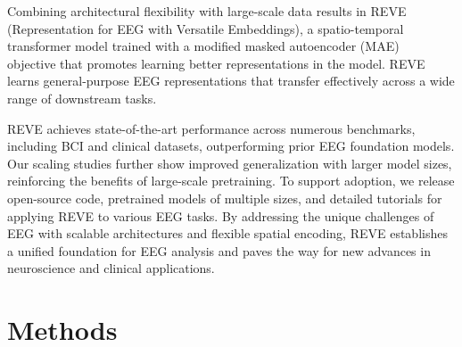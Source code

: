 \documentclass{article}
\begin{document}
Combining architectural flexibility with large-scale data results in REVE (Representation for EEG with Versatile Embeddings), a spatio-temporal transformer model trained with a modified masked autoencoder (MAE)~\citep{he2022masked} objective that promotes learning better representations in the model. REVE learns general-purpose EEG representations that transfer effectively across a wide range of downstream tasks.



REVE achieves state-of-the-art performance across numerous benchmarks, including BCI and clinical datasets, outperforming prior EEG foundation models. Our scaling studies further show improved generalization with larger model sizes, reinforcing the benefits of large-scale pretraining. To support adoption, we release open-source code, pretrained models of multiple sizes, and detailed tutorials for applying REVE to various EEG tasks. By addressing the unique challenges of EEG with scalable architectures and flexible spatial encoding, REVE establishes a unified foundation for EEG analysis and paves the way for new advances in neuroscience and clinical applications.

\section{Methods}
\label{sec:method}
\end{document}
